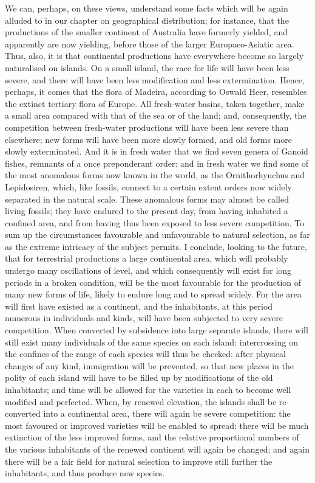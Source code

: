 We can, perhaps, on these views, understand some facts which will be again alluded to in our chapter on geographical distribution; for instance, that the productions of the smaller continent of Australia have formerly yielded, and apparently are now yielding, before those of the larger Europaeo-Asiatic area. Thus, also, it is that continental productions have everywhere become so largely naturalised on islands. On a small island, the race for life will have been less severe, and there will have been less modification and less extermination. Hence, perhaps, it comes that the flora of Madeira, according to Oswald Heer, resembles the extinct tertiary flora of Europe. All fresh-water basins, taken together, make a small area compared with that of the sea or of the land; and, consequently, the competition between fresh-water productions will have been less severe than elsewhere; new forms will have been more slowly formed, and old forms more slowly exterminated. And it is in fresh water that we find seven genera of Ganoid fishes, remnants of a once preponderant order: and in fresh water we find some of the most anomalous forms now known in the world, as the Ornithorhynchus and Lepidosiren, which, like fossils, connect to a certain extent orders now widely separated in the natural scale. These anomalous forms may almost be called living fossils; they have endured to the present day, from having inhabited a confined area, and from having thus been exposed to less severe competition.
To sum up the circumstances favourable and unfavourable to natural selection, as far as the extreme intricacy of the subject permits. I conclude, looking to the future, that for terrestrial productions a large continental area, which will probably undergo many oscillations of level, and which consequently will exist for long periods in a broken condition, will be the most favourable for the production of many new forms of life, likely to endure long and to spread widely. For the area will first have existed as a continent, and the inhabitants, at this period numerous in individuals and kinds, will have been subjected to very severe competition. When converted by subsidence into large separate islands, there will still exist many individuals of the same species on each island: intercrossing on the confines of the range of each species will thus be checked: after physical changes of any kind, immigration will be prevented, so that new places in the polity of each island will have to be filled up by modifications of the old inhabitants; and time will be allowed for the varieties in each to become well modified and perfected. When, by renewed elevation, the islands shall be re-converted into a continental area, there will again be severe competition: the most favoured or improved varieties will be enabled to spread: there will be much extinction of the less improved forms, and the relative proportional numbers of the various inhabitants of the renewed continent will again be changed; and again there will be a fair field for natural selection to improve still further the inhabitants, and thus produce new species.
